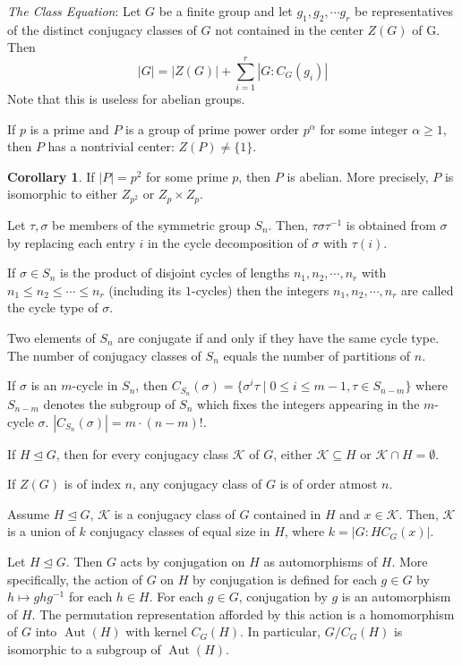 \documentclass{article}
\DeclareMathOperator{\Aut}{Aut}
\numberwithin{equation}{section}
\theoremstyle{definition}
\newtheorem{corollary}[theorem]{Corollary}
\numberwithin{definition}{section}
\numberwithin{theorem}{section}
\theoremstyle{remark}
\numberwithin{exercise}{section}
\begin{document}
    \textit{The Class Equation}: Let $G$ be a finite group and let $g_1, g_2, \cdots g_r$ be representatives of the distinct conjugacy classes of $G$ not contained in the center $Z(G)$ of G. Then $$|G|=|Z(G)|+\sum_{i=1}^{r}|G:C_G(g_i)|$$ Note that this is useless for abelian groups.
    
    If $p$ is a prime and $P$ is a group of prime power order $p^{\alpha}$ for some integer $\alpha\geq 1$, then $P$ has a nontrivial center: $Z(P)\neq \{1\}$.
    
    \begin{corollary}
    If $|P|=p^2$ for some prime $p$, then $P$ is abelian. More precisely, $P$ is isomorphic to either $Z_{p^2}$ or $Z_p\times Z_p$.
    \end{corollary}
    
    Let $\tau, \sigma$ be members of the symmetric group $S_n$. Then, $\tau\sigma\tau^{-1}$ is obtained from $\sigma$ by replacing each entry $i$ in the cycle decomposition of $\sigma$ with $\tau(i)$.
    
    If $\sigma\in S_n$ is the product of disjoint cycles of lengths $n_1,n_2,\cdots, n_r$ with $n_1\leq n_2\leq\cdots\leq n_r$ (including its $1$-cycles) then the integers $n_1,n_2,\cdots,n_r$ are called the cycle type of $\sigma$.
    
    Two elements of $S_n$ are conjugate if and only if they have the same cycle type. The number of conjugacy classes of $S_n$ equals the number of partitions of $n$.
    
    If $\sigma$ is an $m$-cycle in $S_n$, then $C_{S_n}(\sigma)=\{\sigma^i\tau\mid 0\leq i\leq m-1, \tau\in S_{n-m}\}$ where $S_{n-m}$ denotes the subgroup of $S_n$ which fixes the integers appearing in the $m$-cycle $\sigma$. $|C_{S_{n}}(\sigma)|=m\cdot(n-m)!$.
    
    If $H\unlhd G$, then for every conjugacy class $\mathcal{K}$ of $G$, either $\mathcal{K}\subseteq H$ or $\mathcal{K}\cap H = \emptyset$.
    
    If $Z(G)$ is of index $n$, any conjugacy class of $G$ is of order atmost $n$. 
    
    Assume $H\unlhd G$, $\mathcal{K}$ is a conjugacy class of $G$ contained in $H$ and $x\in\mathcal{K}$. Then, $\mathcal{K}$ is a union of $k$ conjugacy classes of equal size in $H$, where $k = |G\mathrel{:}HC_G(x)|$.
    
    Let $H\unlhd G$. Then $G$ acts by conjugation on $H$ as automorphisms of $H$. More specifically, the action of $G$ on $H$ by conjugation is defined for each $g\in G$ by $h\mapsto ghg^{-1}$ for each $h\in H$. For each $g\in G$, conjugation by $g$ is an automorphism of $H$. The permutation representation afforded by this action is a homomorphism of $G$ into $\operatorname{Aut}(H)$ with kernel $C_G(H)$. In particular, $G/C_G(H)$ is isomorphic to a subgroup of $\Aut(H)$.
    
\end{document}
